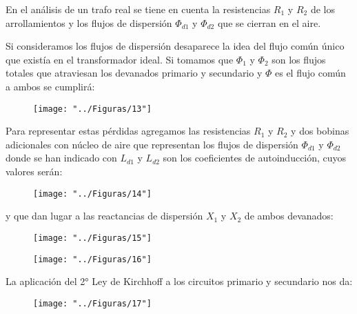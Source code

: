 En el análisis de un trafo real se tiene en cuenta la resistencias $R_{1}$ y $R_{2}$ de los arrollamientos y los flujos de dispersión $\Phi_{d1}$ y $\Phi_{d2}$ que se cierran en el aire.

Si consideramos los flujos de dispersión desaparece la idea del flujo común único que existía en el transformador ideal. Si tomamos que $\Phi_{1}$ y $\Phi_{2}$ son los flujos totales que atraviesan los devanados primario y secundario y $\Phi$ es el flujo común a ambos se cumplirá:

 \begin{figure}[H]
	\centering
	\texttt{[image: "../Figuras/13"]}
\end{figure} 

Para representar estas pérdidas agregamos las resistencias $R_{1}$ y $R_{2}$ y dos bobinas adicionales con núcleo de aire que representan los flujos de dispersión $\Phi_{d1}$ y $\Phi_{d2}$ donde se han indicado con $L_{d1}$ y $L_{d2}$ son los coeficientes de autoinducción, cuyos valores serán:

 \begin{figure}[H]
	\centering
	\texttt{[image: "../Figuras/14"]}
\end{figure} 

y que dan lugar a las reactancias de dispersión $X_{1}$ y $X_{2}$ de ambos devanados:
 \begin{figure}[H]
	\centering
	\texttt{[image: "../Figuras/15"]}
\end{figure} 

 \begin{figure}[H]
	\centering
	\texttt{[image: "../Figuras/16"]}
\end{figure} 

La aplicación del 2° Ley de Kirchhoff a los circuitos primario y secundario nos da:

 \begin{figure}[H]
	\centering
	\texttt{[image: "../Figuras/17"]}
\end{figure} 


 